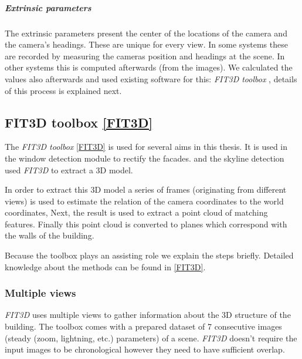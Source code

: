 \subparagraph{Extrinsic parameters}
The extrinsic parameters present the center of the locations of the camera
and the camera's headings. These are unique for every view.
In some systems these are recorded by measuring the cameras position and
headings at the scene. In other systems this is computed afterwards (from the
images).  We calculated the values also afterwards and used existing software for
this: \emph{FIT3D toolbox} \cite{FIT3D}, details of this process is
explained next.


\subsection{FIT3D toolbox \ref{FIT3D}}
\label{sec:prelimFIT3D}
The \emph{FIT3D toolbox} \ref{FIT3D} is used for several aims in this thesis.
It is used in the window detection module to rectify the facades.
and the skyline detection used \emph{FIT3D} to extract a 3D model.

In order to extract this 3D model a series of frames (originating from different
views) is used to estimate the relation of the camera coordinates to the
world coordinates, Next, the result is used to extract a point cloud of matching
features. Finally this point cloud is converted to planes which correspond with the walls of the building.

Because the toolbox plays an assisting role we explain the steps briefly.
Detailed knowledge about the methods can be found in \ref{FIT3D}.

\subsubsection{Multiple views}
\emph{FIT3D} uses multiple views to gather information about the 3D structure of the
building. The toolbox comes with a prepared dataset of 7 consecutive images (steady (zoom, lightning,
etc.) parameters) of a scene.  \emph{FIT3D} doesn't require the input images to be
chronological however they need to have sufficient overlap. 


